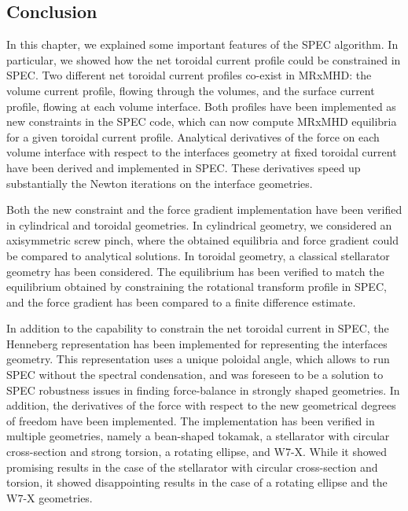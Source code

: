 \documentclass[my_thesis.tex]{subfiles}
\begin{document}
\subsection{Conclusion}\label{chap3 - conclusion}

In this chapter, we explained some important features of the SPEC algorithm. In particular, we showed how the net toroidal current profile could be constrained in SPEC. Two different net toroidal current profiles co-exist in MRxMHD: the volume current profile, flowing through the volumes, and the surface current profile, flowing at each volume interface. Both profiles have been implemented as new constraints in the \ac{SPEC} code, which can now compute \ac{MRxMHD} equilibria for a given toroidal current profile. Analytical derivatives of the force on each volume interface with respect to the interfaces geometry at fixed toroidal current have been derived and implemented in \ac{SPEC}. These derivatives speed up substantially the Newton iterations on the interface geometries.

Both the new constraint and the force gradient implementation have been verified in cylindrical and toroidal geometries. In cylindrical geometry, we considered an axisymmetric screw pinch, where the obtained equilibria and force gradient could be compared to analytical solutions. In toroidal geometry, a classical stellarator geometry has been considered. The equilibrium has been verified to match the equilibrium obtained by constraining the rotational transform profile in \ac{SPEC}, and the force gradient has been compared to a finite difference estimate. 

In addition to the capability to constrain the net toroidal current in SPEC, the Henneberg representation has been implemented for representing the interfaces geometry. This representation uses a unique poloidal angle, which allows to run SPEC without the spectral condensation, and was foreseen to be a solution to SPEC robustness issues in finding force-balance in strongly shaped geometries. In addition, the derivatives of the force with respect to the new geometrical degrees of freedom have been implemented. The implementation has been verified in multiple geometries, namely a bean-shaped tokamak, a stellarator with circular cross-section and strong torsion, a rotating ellipse, and W7-X. While it showed promising results in the case of the stellarator with circular cross-section and torsion, it showed disappointing results in the case of a rotating ellipse and the W7-X geometries.
\end{document}
